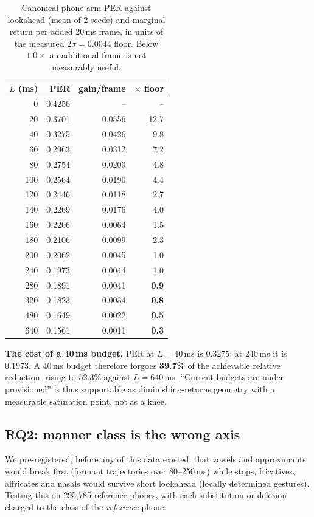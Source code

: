 \documentclass[9pt,a4paper,twocolumn]{article}
\begin{document}
\begin{table}[t]
\centering\small
\caption{Canonical-phone-arm PER against lookahead (mean of 2 seeds) and marginal
return per added 20\,ms frame, in units of the measured $2\sigma{=}0.0044$
floor. Below $1.0\times$ an additional frame is not measurably useful.}
\label{tab:dense}
\begin{tabular}{rrrr}
\toprule
$L$ (ms) & PER & gain/frame & $\times$ floor \\
\midrule
0   & 0.4256 & --     & -- \\
20  & 0.3701 & 0.0556  & 12.7 \\
40  & 0.3275 & 0.0426  & 9.8 \\
60  & 0.2963 & 0.0312  & 7.2 \\
80  & 0.2754 & 0.0209  & 4.8 \\
100 & 0.2564 & 0.0190  & 4.4 \\
120 & 0.2446 & 0.0118  & 2.7 \\
140 & 0.2269 & 0.0176  & 4.0 \\
160 & 0.2206 & 0.0064  & 1.5 \\
180 & 0.2106 & 0.0099  & 2.3 \\
200 & 0.2062 & 0.0045  & 1.0 \\
240 & 0.1973 & 0.0044  & 1.0 \\
280 & 0.1891 & 0.0041  & \textbf{0.9} \\
320 & 0.1823 & 0.0034  & \textbf{0.8} \\
480 & 0.1649 & 0.0022  & \textbf{0.5} \\
640 & 0.1561 & 0.0011  & \textbf{0.3} \\
\bottomrule
\end{tabular}
\end{table}

\textbf{The cost of a 40\,ms budget.} PER at $L{=}40$\,ms is $0.3275$; at
240\,ms it is $0.1973$. A 40\,ms budget therefore forgoes \textbf{39.7\%} of
the achievable relative reduction, rising to 52.3\% against $L{=}640$\,ms.
``Current budgets are under-provisioned'' is thus supportable as
diminishing-returns geometry with a measurable saturation point, not as a
knee.

\subsection{RQ2: manner class is the wrong axis}
\label{sec:rq2}

We pre-registered, before any of this data existed, that vowels and
approximants would break first (formant trajectories over 80--250\,ms) while
stops, fricatives, affricates and nasals would survive short lookahead (locally
determined gestures). Testing this on 295{,}785 reference phones, with each
substitution or deletion charged to the class of the \emph{reference} phone:
\end{document}
